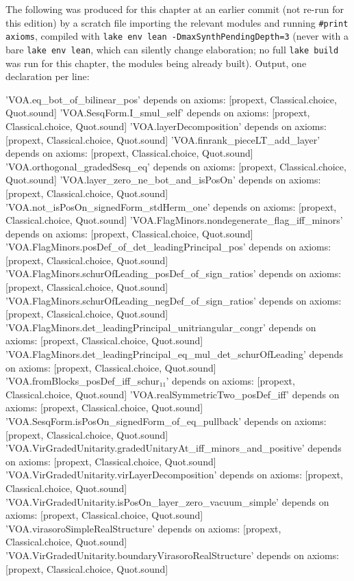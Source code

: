 The following was produced for this chapter at an earlier commit (not re-run for this edition) by a scratch file importing the
relevant modules and running \texttt{\#print axioms}, compiled with
\texttt{lake env lean -DmaxSynthPendingDepth=3} (never with a bare \texttt{lake env lean}, which can silently
change elaboration; no full \texttt{lake build} was run for this chapter, the modules being already built).
Output, one declaration per line:

\begin{plaincode}
'VOA.eq_bot_of_bilinear_pos' depends on axioms: [propext, Classical.choice, Quot.sound]
'VOA.SesqForm.I_smul_self' depends on axioms: [propext, Classical.choice, Quot.sound]
'VOA.layerDecomposition' depends on axioms: [propext, Classical.choice, Quot.sound]
'VOA.finrank_pieceLT_add_layer' depends on axioms: [propext, Classical.choice, Quot.sound]
'VOA.orthogonal_gradedSesq_eq' depends on axioms: [propext, Classical.choice, Quot.sound]
'VOA.layer_zero_ne_bot_and_isPosOn' depends on axioms: [propext, Classical.choice, Quot.sound]
'VOA.not_isPosOn_signedForm_stdHerm_one' depends on axioms: [propext, Classical.choice, Quot.sound]
'VOA.FlagMinors.nondegenerate_flag_iff_minors' depends on axioms: [propext, Classical.choice, Quot.sound]
'VOA.FlagMinors.posDef_of_det_leadingPrincipal_pos' depends on axioms: [propext, Classical.choice, Quot.sound]
'VOA.FlagMinors.schurOfLeading_posDef_of_sign_ratios' depends on axioms: [propext, Classical.choice, Quot.sound]
'VOA.FlagMinors.schurOfLeading_negDef_of_sign_ratios' depends on axioms: [propext, Classical.choice, Quot.sound]
'VOA.FlagMinors.det_leadingPrincipal_unitriangular_congr' depends on axioms: [propext, Classical.choice, Quot.sound]
'VOA.FlagMinors.det_leadingPrincipal_eq_mul_det_schurOfLeading' depends on axioms: [propext, Classical.choice, Quot.sound]
'VOA.fromBlocks_posDef_iff_schur₁₁' depends on axioms: [propext, Classical.choice, Quot.sound]
'VOA.realSymmetricTwo_posDef_iff' depends on axioms: [propext, Classical.choice, Quot.sound]
'VOA.SesqForm.isPosOn_signedForm_of_eq_pullback' depends on axioms: [propext, Classical.choice, Quot.sound]
'VOA.VirGradedUnitarity.gradedUnitaryAt_iff_minors_and_positive' depends on axioms: [propext, Classical.choice, Quot.sound]
'VOA.VirGradedUnitarity.virLayerDecomposition' depends on axioms: [propext, Classical.choice, Quot.sound]
'VOA.VirGradedUnitarity.isPosOn_layer_zero_vacuum_simple' depends on axioms: [propext, Classical.choice, Quot.sound]
'VOA.virasoroSimpleRealStructure' depends on axioms: [propext, Classical.choice, Quot.sound]
'VOA.VirGradedUnitarity.boundaryVirasoroRealStructure' depends on axioms: [propext, Classical.choice, Quot.sound]

\end{plaincode}
